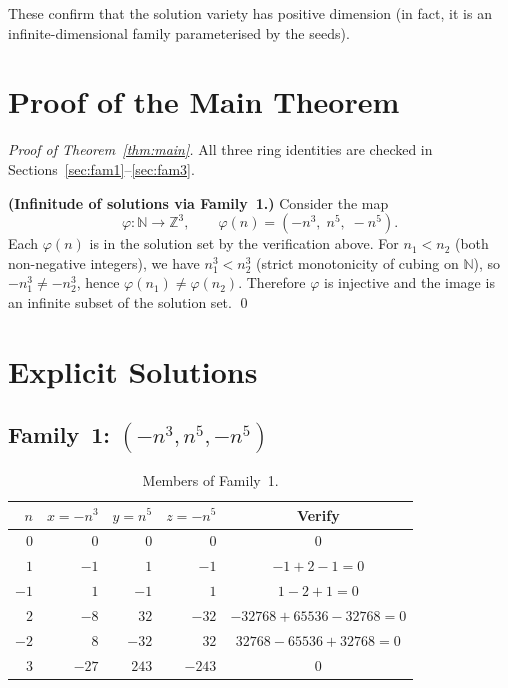 \documentclass[12pt,a4paper]{article}
\theoremstyle{definition}
\newcommand{\Z}{\mathbb{Z}}
\newcommand{\N}{\mathbb{N}}
\begin{document}
These confirm that the solution variety has positive dimension (in fact, it is an
infinite-dimensional family parameterised by the seeds).

\section{Proof of the Main Theorem}\label{sec:proof}

\begin{proof}[Proof of Theorem~\ref{thm:main}]
  All three ring identities are checked in Sections~\ref{sec:fam1}--\ref{sec:fam3}.

  \textbf{(Infinitude of solutions via Family~1.)}
  Consider the map
  \[
    \varphi : \N \to \Z^3, \qquad \varphi(n) = (-n^3,\; n^5,\; -n^5).
  \]
  Each $\varphi(n)$ is in the solution set by the verification above.
  For $n_1 < n_2$ (both non-negative integers), we have $n_1^3 < n_2^3$
  (strict monotonicity of cubing on $\N$), so $-n_1^3 \neq -n_2^3$, hence
  $\varphi(n_1) \neq \varphi(n_2)$.  Therefore $\varphi$ is injective and the
  image is an infinite subset of the solution set.
  \qed
\end{proof}

\section{Explicit Solutions}\label{sec:explicit}

\subsection{Family~1: $(-n^3, n^5, -n^5)$}

\begin{table}[h]
\centering
\caption{Members of Family~1.}
\label{tab:family1}
\renewcommand{\arraystretch}{1.2}
\begin{tabular}{rrrrc}
\toprule
$n$ & $x = -n^3$ & $y = n^5$ & $z = -n^5$ & Verify \\
\midrule
$0$  & $0$    & $0$      & $0$       & $0$ \\
$1$  & $-1$   & $1$      & $-1$      & $-1+2-1=0$ \\
$-1$ & $1$    & $-1$     & $1$       & $1-2+1=0$ \\
$2$  & $-8$   & $32$     & $-32$     & $-32768+65536-32768=0$ \\
$-2$ & $8$    & $-32$    & $32$      & $32768-65536+32768=0$ \\
$3$  & $-27$  & $243$    & $-243$    & $0$ \\
\bottomrule
\end{tabular}
\end{table}
\end{document}
